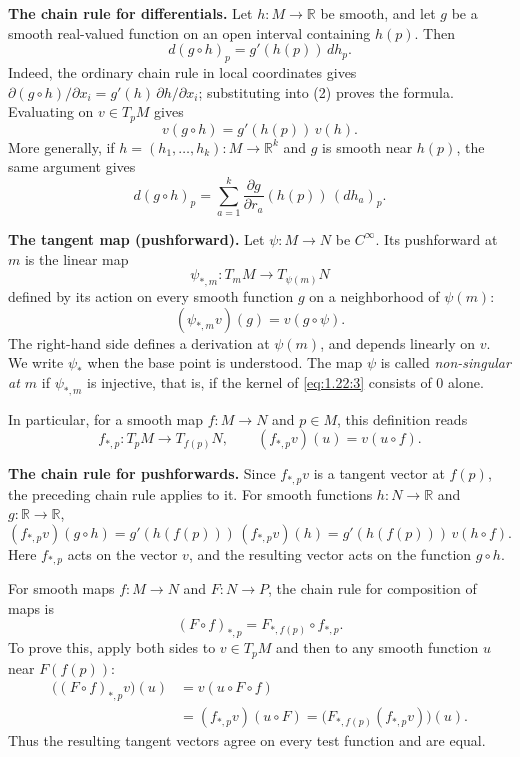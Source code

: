 \medskip\noindent\textbf{The chain rule for differentials.}
Let $h:M\to\mathbb R$ be smooth, and let $g$ be a smooth real-valued
function on an open interval containing $h(p)$. Then
\[
  d(g\circ h)_p=g'(h(p))\,dh_p.
\]
Indeed, the ordinary chain rule in local coordinates gives
$\partial(g\circ h)/\partial x_i=g'(h)\,\partial h/\partial x_i$;
substituting into (2) proves the formula. Evaluating on $v\in T_pM$ gives
\[
  v(g\circ h)=g'(h(p))\,v(h).
\]
More generally, if $h=(h_1,\ldots,h_k):M\to\mathbb R^k$ and $g$ is
smooth near $h(p)$, the same argument gives
\[
  d(g\circ h)_p
  =\sum_{a=1}^k\frac{\partial g}{\partial r_a}(h(p))\,(dh_a)_p.
\]

\medskip\noindent\textbf{The tangent map (pushforward).}
Let $\psi:M\to N$ be $C^\infty$. Its pushforward at $m$ is the linear map
\begin{equation}
  \tag{3}\label{eq:1.22:3}
  \psi_{*,m}:T_mM\longrightarrow T_{\psi(m)}N
\end{equation}
defined by its action on every smooth function $g$ on a neighborhood
of $\psi(m)$:
\begin{equation}
  \tag{4}\label{eq:1.22:4}
  (\psi_{*,m}v)(g)=v(g\circ\psi).
\end{equation}
The right-hand side defines a derivation at $\psi(m)$, and depends
linearly on $v$. We write $\psi_*$ when the base point is understood.
The map $\psi$ is called \emph{non-singular at $m$} if $\psi_{*,m}$
is injective, that is, if the kernel of \eqref{eq:1.22:3} consists
of $0$ alone. 

In particular, for a smooth map $f:M\to N$ and $p\in M$, this definition
reads
\[
  f_{*,p}:T_pM\to T_{f(p)}N,\qquad (f_{*,p}v)(u)=v(u\circ f).
\]

\medskip\noindent\textbf{The chain rule for pushforwards.}
Since $f_{*,p}v$ is a tangent vector at $f(p)$, the preceding chain
rule applies to it. For smooth functions $h:N\to\mathbb R$ and
$g:\mathbb R\to\mathbb R$,
\[
  (f_{*,p}v)(g\circ h)
  =g'(h(f(p)))\,(f_{*,p}v)(h)
  =g'(h(f(p)))\,v(h\circ f).
\]
Here $f_{*,p}$ acts on the vector $v$, and the resulting vector acts
on the function $g\circ h$.

For smooth maps $f:M\to N$ and $F:N\to P$, the chain rule for
composition of maps is
\[
  (F\circ f)_{*,p}=F_{*,f(p)}\circ f_{*,p}.
\]
To prove this, apply both sides to $v\in T_pM$ and then to any smooth
function $u$ near $F(f(p))$:
\[
\begin{aligned}
  \bigl((F\circ f)_{*,p}v\bigr)(u)
  &=v(u\circ F\circ f)\\
  &=(f_{*,p}v)(u\circ F)
  =\bigl(F_{*,f(p)}(f_{*,p}v)\bigr)(u).
\end{aligned}
\]
Thus the resulting tangent vectors agree on every test function and
are equal.

